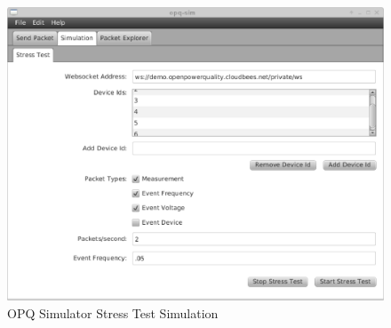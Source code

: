 \begin{figure}[htbp]
	\centering
	\includegraphics[width=\textwidth]{figures/sim_stress_test.eps}
	\caption{OPQ Simulator Stress Test Simulation}
	\label{fig:sim_multi}
\end{figure}
